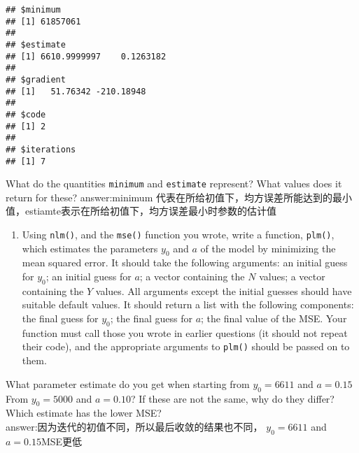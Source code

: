 \documentclass[
]{article}
\newenvironment{Shaded}{\begin{snugshade}}{\end{snugshade}}
\newcommand{\ControlFlowTok}[1]{\textcolor[rgb]{0.13,0.29,0.53}{\textbf{#1}}}
\newcommand{\DataTypeTok}[1]{\textcolor[rgb]{0.13,0.29,0.53}{#1}}
\newcommand{\DecValTok}[1]{\textcolor[rgb]{0.00,0.00,0.81}{#1}}
\newcommand{\KeywordTok}[1]{\textcolor[rgb]{0.13,0.29,0.53}{\textbf{#1}}}
\newcommand{\NormalTok}[1]{#1}
\newcommand{\OperatorTok}[1]{\textcolor[rgb]{0.81,0.36,0.00}{\textbf{#1}}}
\providecommand{\tightlist}{%
  \setlength{\itemsep}{0pt}\setlength{\parskip}{0pt}}
\begin{document}
\begin{verbatim}
## $minimum
## [1] 61857061
## 
## $estimate
## [1] 6610.9999997    0.1263182
## 
## $gradient
## [1]   51.76342 -210.18948
## 
## $code
## [1] 2
## 
## $iterations
## [1] 7
\end{verbatim}

What do the quantities \texttt{minimum} and \texttt{estimate} represent?
What values does it return for these? answer:minimum
代表在所给初值下，均方误差所能达到的最小值，estiamte表示在所给初值下，均方误差最小时参数的估计值

\begin{enumerate}
\def\labelenumi{\arabic{enumi}.}
\setcounter{enumi}{3}
\tightlist
\item
  Using \texttt{nlm()}, and the \texttt{mse()} function you wrote, write
  a function, \texttt{plm()}, which estimates the parameters \(y_0\) and
  \(a\) of the model by minimizing the mean squared error. It should
  take the following arguments: an initial guess for \(y_0\); an initial
  guess for \(a\); a vector containing the \(N\) values; a vector
  containing the \(Y\) values. All arguments except the initial guesses
  should have suitable default values. It should return a list with the
  following components: the final guess for \(y_0\); the final guess for
  \(a\); the final value of the MSE. Your function must call those you
  wrote in earlier questions (it should not repeat their code), and the
  appropriate arguments to \texttt{plm()} should be passed on to them.
\end{enumerate}

\begin{Shaded}
\end{Shaded}

What parameter estimate do you get when starting from \(y_0 = 6611\) and
\(a = 0.15\) From \(y_0 = 5000\) and \(a = 0.10\)? If these are not the
same, why do they differ? Which estimate has the lower MSE?\\
answer:因为迭代的初值不同，所以最后收敛的结果也不同， \(y_0 = 6611\) and
\(a = 0.15\)MSE更低
\end{document}
